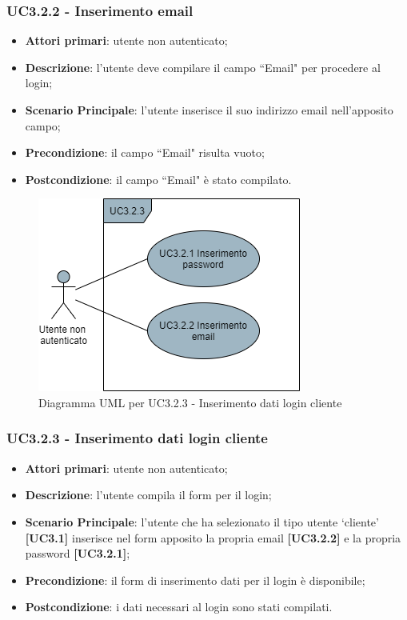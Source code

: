 \subsubsection{UC3.2.2 - Inserimento email}
\begin{itemize}
\item \textbf{Attori primari}: utente non autenticato;
\item \textbf{Descrizione}: l'utente deve compilare il campo ``Email" per procedere al login;
\item \textbf{Scenario Principale}: l'utente inserisce il suo indirizzo email nell'apposito campo;
\item \textbf{Precondizione}: il campo ``Email" risulta vuoto;
\item \textbf{Postcondizione}: il campo ``Email" è stato compilato.
\end{itemize}

\begin{figure}[H]
\centering
\includegraphics[scale=0.6]{res/UseCase/Immagini/InserimentoDatiLoginCliente}
\caption{Diagramma UML per UC3.2.3 - Inserimento dati login cliente}
\end{figure}

\subsubsection{UC3.2.3 - Inserimento dati login cliente}
\begin{itemize}
\item \textbf{Attori primari}: utente non autenticato;
\item \textbf{Descrizione}: l'utente compila il form per il login;
\item \textbf{Scenario Principale}: l'utente che ha selezionato il tipo utente `cliente' \textbf{[UC3.1]} inserisce nel form apposito la propria email \textbf{[UC3.2.2]} e la propria password \textbf{[UC3.2.1]};
\item \textbf{Precondizione}: il form di inserimento dati per il login è disponibile;
\item \textbf{Postcondizione}: i dati necessari al login sono stati compilati.
\end{itemize}

